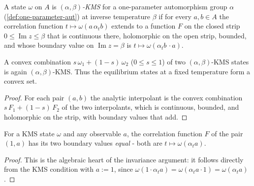 \begin{definition}
    \label{def:kms-state}
    \leanok
    A state $\omega$ on $A$ is \emph{$(\alpha, \beta)$-KMS} for a one-parameter automorphism group $\alpha$ (\ref{def:one-parameter-aut}) at inverse temperature $\beta$ if for every $a, b \in A$ the correlation function $t \mapsto \omega(a\,\alpha_t b)$ extends to a function $F$ on the closed strip $0 \le \operatorname{Im} z \le \beta$ that is continuous there, holomorphic on the open strip, bounded, and whose boundary value on $\operatorname{Im} z = \beta$ is $t \mapsto \omega(\alpha_t b\, \cdot a)$.
\end{definition}

\begin{theorem}
    \label{thrm:kms-convex}
    \leanok
    A convex combination $s\,\omega_1 + (1-s)\,\omega_2$ ($0 \le s \le 1$) of two $(\alpha, \beta)$-KMS states is again $(\alpha, \beta)$-KMS. Thus the equilibrium states at a fixed temperature form a convex set.
\end{theorem}
\begin{proof}
    \leanok
    For each pair $(a, b)$ the analytic interpolant is the convex combination $s\,F_1 + (1-s)\,F_2$ of the two interpolants, which is continuous, bounded, and holomorphic on the strip, with boundary values that add.
\end{proof}

\begin{lemma}[Boundary Coincidence for $a = 1$]
    \label{lmm:kms-correlation-one}
    \leanok
    For a KMS state $\omega$ and any observable $a$, the correlation function $F$ of the pair $(1, a)$ has its two boundary values \emph{equal} - both are $t \mapsto \omega(\alpha_t a)$.
\end{lemma}
\begin{proof}
    \leanok
    This is the algebraic heart of the invariance argument: it follows directly from the KMS condition with $a := 1$, since $\omega(1\cdot\alpha_t a) = \omega(\alpha_t a \cdot 1) = \omega(\alpha_t a)$.
\end{proof}

